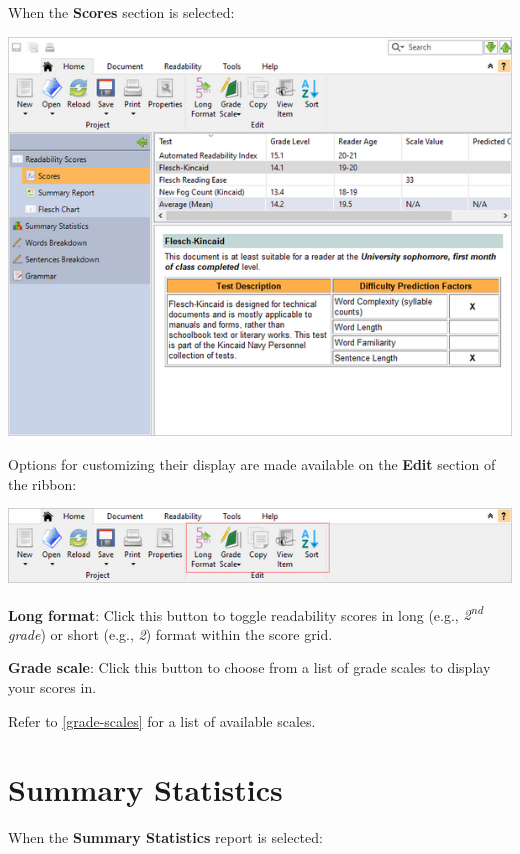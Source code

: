 \documentclass[
]{book}
\theoremstyle{definition}
\theoremstyle{definition}
\theoremstyle{definition}
\theoremstyle{definition}
\theoremstyle{remark}
\begin{document}
When the \textbf{Scores} section is selected:

\includegraphics{Images/featuresscores.png}

Options for customizing their display are made available on the \textbf{Edit} section of the ribbon:

\includegraphics{Images/RibbonEditScores.png}

\textbf{Long format}: Click this button to toggle readability scores in long (e.g., \emph{2\textsuperscript{nd} grade}) or short (e.g., \emph{2}) format within the score grid.

\textbf{Grade scale}: Click this button to choose from a list of grade scales to display your scores in.

Refer to \ref{grade-scales} for a list of available scales.

\hypertarget{summary-statistics}{%
\section{Summary Statistics}\label{summary-statistics}}

When the \textbf{Summary Statistics} report is selected:
\end{document}
